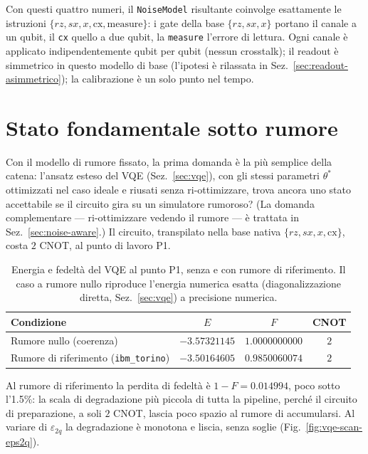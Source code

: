 \documentclass[11pt,a4paper]{article}
\begin{document}
Con questi quattro numeri, il \texttt{NoiseModel} risultante coinvolge
esattamente le istruzioni $\{rz,sx,x,\mathrm{cx},\mathrm{measure}\}$: i
gate della base $\{rz,sx,x\}$ portano il canale a un qubit, il
\texttt{cx} quello a due qubit, la \texttt{measure} l'errore di lettura.
Ogni canale è applicato indipendentemente qubit per qubit (nessun
crosstalk); il readout è simmetrico in questo modello di base (l'ipotesi
è rilassata in Sez.~\ref{sec:readout-asimmetrico}); la calibrazione è un
solo punto nel tempo.

\section{Stato fondamentale sotto rumore}
\label{sec:vqe-rumore}

Con il modello di rumore fissato, la prima domanda è la più semplice
della catena: l'ansatz esteso del VQE (Sez.~\ref{sec:vqe}), con gli stessi
parametri $\theta^*$ ottimizzati nel caso ideale e riusati senza
ri-ottimizzare, trova ancora uno stato accettabile se il circuito gira su
un simulatore rumoroso? (La domanda complementare --- ri-ottimizzare
vedendo il rumore --- è trattata in Sez.~\ref{sec:noise-aware}.) Il
circuito, transpilato nella base nativa $\{rz,sx,x,\mathrm{cx}\}$, costa
$2$ CNOT, al punto di lavoro P1.

\begin{table}[htbp]
\centering
\renewcommand{\arraystretch}{1.3}
\begin{tabular}{@{}lccc@{}}
\toprule
Condizione & $E$ & $F$ & CNOT\\
\midrule
Rumore nullo (coerenza) & $-3.57321145$ & $1.0000000000$ & $2$\\
Rumore di riferimento (\texttt{ibm\_torino}) & $-3.50164605$ & $0.9850060074$ & $2$\\
\bottomrule
\end{tabular}
\caption{Energia e fedeltà del VQE al punto P1, senza e con rumore di
riferimento. Il caso a rumore nullo riproduce l'energia numerica esatta
(diagonalizzazione diretta, Sez.~\ref{sec:vqe}) a precisione numerica.}
\label{tab:vqe-rumore}
\end{table}

Al rumore di riferimento la perdita di fedeltà è $1-F=0.014994$, poco
sotto l'1.5\%: la scala di degradazione più piccola di tutta la pipeline,
perché il circuito di preparazione, a soli $2$ CNOT, lascia poco spazio
al rumore di accumularsi. Al variare di $\varepsilon_{2q}$ la degradazione
è monotona e liscia, senza soglie (Fig.~\ref{fig:vqe-scan-eps2q}).
\end{document}
